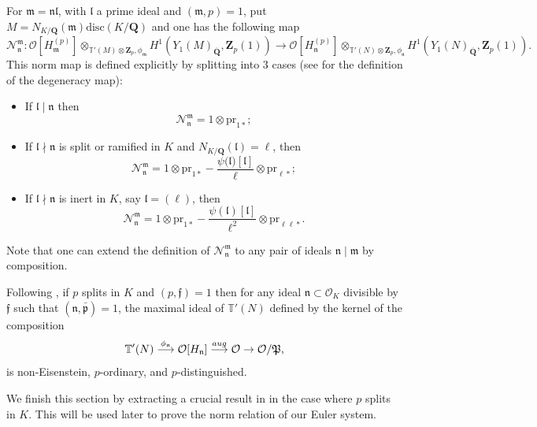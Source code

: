 \documentclass[10pt,letterpaper]{amsart}
\theoremstyle{plain}
\theoremstyle{definition}
\theoremstyle{definition}
\theoremstyle{plain}
\theoremstyle{plain}
\theoremstyle{plain}
\theoremstyle{remark}
\numberwithin{equation}{section}
\newcommand{\ppbar}{\bar{\mathfrak{p}}}
\newcommand{\fkm}{\mathfrak{m}}
\newcommand{\fkf}{\mathfrak{f}}
\newcommand{\fkl}{\mathfrak{l}}
\newcommand{\fkn}{\mathfrak{n}}
\DeclareMathOperator{\et}{\acute{e}t}
\def\cO{\mathcal O}
\newcommand{\Q}{\mathbf{Q}}
\newcommand{\Z}{\mathbf{Z}}
\begin{document}
\vspace{10pt}

For $\fkm=\fkn\fkl$, with $\fkl$ a prime ideal and $(\fkm,p)=1$, put $M=N_{K/\Q}(\fkm)\text{disc}(K/\Q)$ and one has the following map
\begin{equation}
\mathcal{N}_{\fkn}^{\fkm}:\mathcal{O}[H_{\fkm}^{(p)}]\otimes_{\mathbb{T}'(M)\otimes\Z_p,\phi_{\fkm}}H^1_{\et}(Y_1(M)_{\overline{\Q}},\Z_p(1))\rightarrow \mathcal{O}[H_{\fkn}^{(p)}]\otimes_{\mathbb{T}'(N)\otimes\Z_p,\phi_{\fkn}}H^1_{\et}(Y_1(N)_{\overline{\Q}},\Z_p(1)).\nonumber
\end{equation}
This norm map is defined explicitly by splitting into $3$ cases (see \cite[Sec.\,1.1.2]{CD} for the definition of the degeneracy map): 
\begin{itemize}
    \item If $\fkl\mid\fkn$ then 
    \begin{equation*}
        \mathcal{N}_{\fkn}^{\fkm}=1\otimes \text{pr}_{1*};
    \end{equation*}
    \item If $\fkl\nmid\fkn$ is split or ramified in $K$ and $N_{K/\Q}(\fkl)=\ell$, then 
    \begin{equation*}
        \mathcal{N}_{\fkn}^{\fkm}=1\otimes \text{pr}_{1*}-\frac{\psi(\mathfrak{l)}[\fkl]}{\ell}\otimes \text{pr}_{\ell*};
    \end{equation*}
    \item If $\fkl\nmid\fkn$ is inert in $K$, say $\fkl=(\ell)$, then 
    \begin{equation*}
        \mathcal{N}_{\fkn}^{\fkm}=1\otimes \text{pr}_{1*}-\frac{\psi(\fkl)[\fkl]}{\ell^2}\otimes \text{pr}_{\ell\ell*}.
    \end{equation*}
\end{itemize}
Note that one can extend the definition of $\mathcal{N}_{\fkn}^{\fkm}$ to any pair of ideals $\fkn\mid\fkm$ by composition.



Following \cite[Sec.\,1.3.2]{CD}, if $p$ splits in $K$ and $(p,\fkf)=1$ then for any ideal $\fkn\subset\cO_K$ divisible by $\mathfrak{f}$ such that $(\fkn,\ppbar)=1$, the maximal ideal of $\mathbb{T}'(N)$ defined by the kernel of the composition
\[
\mathbb{T}'(N)\overset{\phi_\fkn}\longrightarrow\cO[H_\fkn]\overset{{\rm aug}}\longrightarrow\cO\rightarrow\cO/\mathfrak{P},
\]
is non-Eisenstein, $p$-ordinary, and $p$-distinguished. 

We finish this section by extracting a crucial result in \cite{LLZ-K} in the case where $p$ splits in $K$. This will be used later to prove the norm relation of our Euler system.
\end{document}
